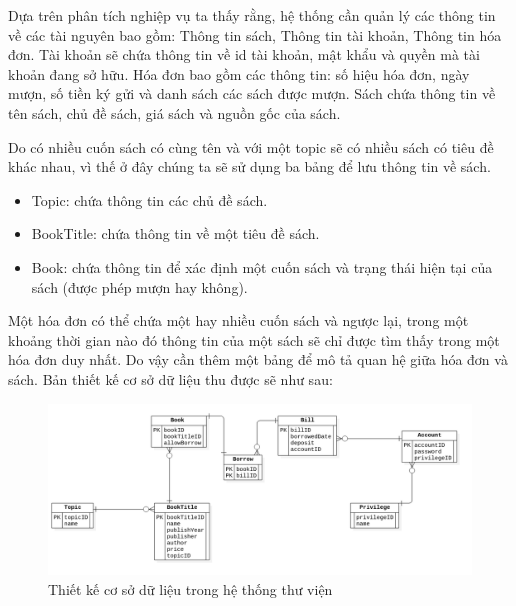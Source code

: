 \documentclass[../report.tex]{subfiles}
\begin{document}
Dựa trên phân tích nghiệp vụ ta thấy rằng, hệ thống cần quản lý các thông 
tin về các tài nguyên bao gồm: Thông tin sách, Thông tin tài khoản, 
Thông tin hóa đơn.
Tài khoản sẽ chứa thông tin về id tài khoản, mật khẩu và quyền mà 
tài khoản đang sở hữu.
Hóa đơn bao gồm các thông tin: số hiệu hóa đơn, ngày mượn, 
số tiền ký gửi và danh sách các sách được mượn.
Sách chứa thông tin về tên sách, chủ đề sách, 
giá sách và nguồn gốc của sách. 

Do có nhiều cuốn sách có cùng tên và với một topic sẽ có nhiều sách có tiêu đề khác nhau,
vì thế ở đây chúng ta sẽ sử dụng ba bảng để lưu thông tin về sách. 
\begin{itemize}
      \item Topic: chứa thông tin các chủ đề sách.
\item BookTitle: chứa thông tin về một tiêu đề sách.
\item Book: chứa thông tin để xác định một cuốn sách và trạng thái 
hiện tại của sách (được phép mượn hay không).

\end{itemize}


Một hóa đơn có thể chứa một hay nhiều cuốn sách và ngược lại, trong một khoảng 
thời gian nào đó thông tin của một sách sẽ chỉ được tìm thấy trong một hóa đơn duy nhất. 
Do vậy cần thêm một bảng để mô tả quan hệ giữa hóa đơn và sách.
 Bản thiết kế cơ sở dữ liệu thu được sẽ như sau:
\begin{figure}[H]
\centering
\includegraphics[width=\textwidth]{figures/db.png}
\caption{Thiết kế cơ sở dữ liệu trong hệ thống thư viện}
\end{figure}
\end{document}
